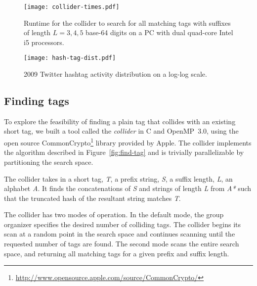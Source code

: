 
\begin{figure*}[t]
\begin{minipage}[b]{0.48\linewidth}
\centering
\texttt{[image: collider-times.pdf]}
    \caption{Runtime for the collider to search for all matching tags with
  suffixes of length $L=3,4,5$ base-64 digits on a PC with dual quad-core Intel i5
  processors.}\label{fig:collider-times}
\end{minipage}
\hspace{0.5cm}
\begin{minipage}[b]{0.48\linewidth}
\centering
\texttt{[image: hash-tag-dist.pdf]}
\caption{2009 Twitter hashtag activity distribution on a log-log
  scale.\vspace{0.4cm}\label{fig:hash-dist}
}
\end{minipage}
\end{figure*}

\subsection{Finding tags}
\label{sec:collider}

To explore the feasibility of finding a plain tag that collides with an
existing short tag, we built a tool called the {\em collider} in C and
OpenMP~3.0, using the open source CommonCrypto\footnote{\url{http://www.opensource.apple.com/source/CommonCrypto/}} library provided
by Apple. The collider implements the  algorithm
described in Figure~\ref{fig:find-tag} and is trivially parallelizable
by partitioning the search space.

The collider takes in a short tag, \textit{T}, a prefix string,
\textit{S}, a suffix length, \textit{L}, an alphabet \textit{A}. It
finds the concatenations of \textit{S} and strings of length \textit{L}
from \textit{A*} such that the truncated hash of the resultant string
matches \textit{T}.

The collider has two modes of operation. In the default mode, the group
organizer specifies the desired number of colliding tags. The collider
begins its scan at a random point in the search space and continues
scanning until the requested number of tags are found. The second mode
scans the entire search space, and returning all matching tags for a
given prefix and suffix length.

